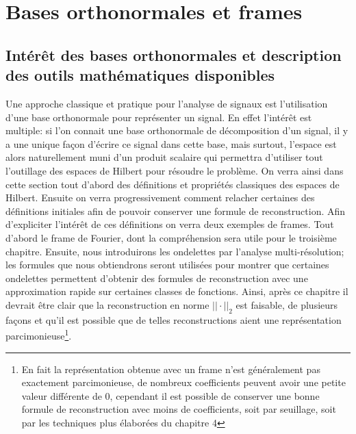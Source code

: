 \section{Bases orthonormales et frames}
\subsection{Intérêt des bases orthonormales et description des outils mathématiques disponibles}
Une approche classique et pratique pour l'analyse de signaux est l'utilisation d'une base orthonormale pour représenter un signal. 
En effet l'intérêt est multiple: si l'on connait une base orthonormale de décomposition d'un signal, il y a une unique façon d'écrire ce signal dans cette base, mais surtout, l'espace est alors naturellement muni d'un produit scalaire qui permettra d'utiliser tout l'outillage des espaces de Hilbert pour résoudre le problème.
\newline
On verra ainsi dans cette section tout d'abord des définitions et propriétés classiques des espaces de Hilbert. 
Ensuite on verra progressivement comment relacher certaines des définitions initiales afin de pouvoir conserver une formule de reconstruction.
Afin d'expliciter l'intérêt de ces définitions on verra deux exemples de frames.
Tout d'abord le frame de Fourier, dont la compréhension sera utile pour le troisième chapitre.
Ensuite, nous introduirons les ondelettes par l'analyse multi-résolution; les formules que nous obtiendrons seront utilisées pour montrer que certaines ondelettes permettent d'obtenir des formules de reconstruction avec une approximation rapide sur certaines classes de fonctions.
Ainsi, après ce chapitre il devrait être clair que la reconstruction en norme $||\cdot||_2$ est faisable, de plusieurs façons et qu'il est possible que de telles reconstructions aient une représentation parcimonieuse\footnote{En fait la représentation obtenue avec un frame n'est généralement pas exactement parcimonieuse, de nombreux coefficients peuvent avoir une petite valeur différente de 0, cependant il est possible de conserver une bonne formule de reconstruction avec moins de coefficients, soit par seuillage, soit par les techniques plus élaborées du chapitre 4}.
